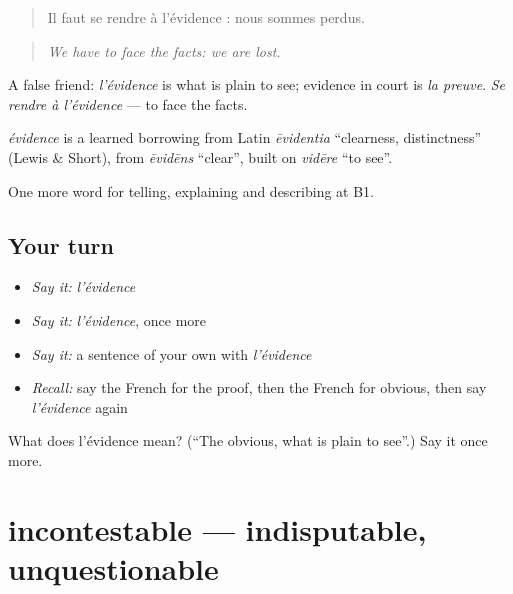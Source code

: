 \begin{quote}
Il faut se rendre à l'évidence : nous sommes perdus.
\end{quote}

\begin{quote}
\emph{We have to face the facts: we are lost.}
\end{quote}

A false friend: \emph{l'évidence} is what is plain to see; evidence in court is \emph{la preuve}. \emph{Se rendre à l'évidence} — to face the facts.

\begin{cousinweb}
\emph{évidence} is a learned borrowing from Latin \emph{ēvidentia} \textquotedblleft{}clearness, distinctness\textquotedblright{} (Lewis \& Short), from \emph{ēvidēns} \textquotedblleft{}clear\textquotedblright{}, built on \emph{vidēre} \textquotedblleft{}to see\textquotedblright{}.
\end{cousinweb}

\begin{grammarlens}[title={What you've built}]
One more word for telling, explaining and describing at B1.
\end{grammarlens}

\subsection*{Your turn}
\begin{itemize}
\raggedright
  \item \emph{Say it:} \emph{l'évidence}
  \item \emph{Say it:} \emph{l'évidence}, once more
  \item \emph{Say it:} a sentence of your own with \emph{l'évidence}
  \item \emph{Recall:} say the French for the proof, then the French for obvious, then say \emph{l'évidence} again
\end{itemize}

\begin{tcolorbox}[breakable,colback=teal!4,colframe=teal!35!black,title={Before you move on}]
What does l'évidence mean? (\textquotedblleft{}The obvious, what is plain to see\textquotedblright{}.) Say it once more.
\end{tcolorbox}
\section[incontestable]{incontestable — indisputable, unquestionable}

